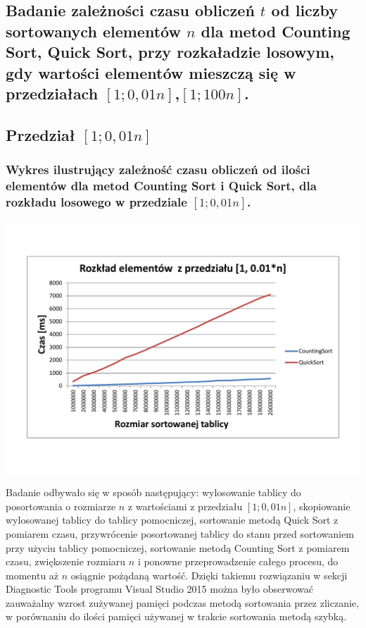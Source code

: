 \documentclass[polish,polish,a4paper]{article}
\begin{document}
\begin{spacing}{1.5}
\section{Badanie zależności czasu obliczeń $t$ od liczby sortowanych elementów $n$ dla metod Counting Sort, Quick Sort, przy rozkaładzie losowym, gdy wartości elementów mieszczą się w przedziałach  $ [1;0,01n] $,$ [1;100n] $. }

\subsection{Przedział $[1;0,01n]$}

\subsubsection*{Wykres ilustrujący zależność czasu obliczeń od ilości elementów dla metod Counting Sort i  Quick Sort, dla rozkładu losowego w przedziale $[1;0,01n]$.}
	
	\begin{minipage}[H]{\textwidth}
		\begin{center}
			\includegraphics[scale=0.6]{zad4001n.pdf}
			\label{fig:zad4001n}
		\end{center}
	\end{minipage}

Badanie odbywało się w sposób następujący: wylosowanie tablicy do posortowania o rozmiarze $n$ z wartościami z przedziału $[1;0,01n]$, skopiowanie wylosowanej tablicy do tablicy pomocniczej, sortowanie metodą Quick Sort z pomiarem czasu, przywrócenie posortowanej tablicy do stanu przed sortowaniem przy użyciu tablicy pomocniczej, sortowanie metodą Counting Sort z pomiarem czasu, zwiększenie rozmiaru $n$ i ponowne przeprowadzenie całego procesu, do momentu aż $n$ osiągnie pożądaną wartość.	Dzięki takiemu rozwiązaniu w sekcji Diagnostic Tools programu Visual Studio 2015 można było obserwować zauważalny  wzrost zużywanej pamięci podczas metodą sortowania przez zliczanie, w porównaniu do ilości pamięci używanej w trakcie sortowania metodą szybką.


\end{spacing}
\end{document}
